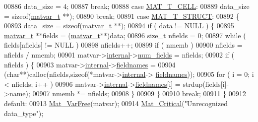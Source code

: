 \begin{DoxyCode}
{{{{{{{{{{{{{{{{{{{{{{00886             data\_size = 4;
00887             \textcolor{keywordflow}{break};
00888         \textcolor{keywordflow}{case} \hyperlink{group___m_a_t_ggacf7b3b879282b7ab3a51190e49bf3453a07599cf2cca6d2b2d059378563318ba5}{MAT\_T\_CELL}:
00889             data\_size = \textcolor{keyword}{sizeof}(\hyperlink{group___m_a_t_structmatvar__t}{matvar\_t} **);
00890             \textcolor{keywordflow}{break};
00891         \textcolor{keywordflow}{case} \hyperlink{group___m_a_t_ggacf7b3b879282b7ab3a51190e49bf3453a4f4d5a6e1d42c6aa81ffb810e5da5c85}{MAT\_T\_STRUCT}:
00892         \{
00893             data\_size = \textcolor{keyword}{sizeof}(\hyperlink{group___m_a_t_structmatvar__t}{matvar\_t} **);
00894             \textcolor{keywordflow}{if} ( data != NULL ) \{
00895                 \hyperlink{group___m_a_t_structmatvar__t}{matvar\_t} **fields = (\hyperlink{group___m_a_t_structmatvar__t}{matvar\_t}**)data;
00896                 \textcolor{keywordtype}{size\_t} nfields = 0;
00897                 \textcolor{keywordflow}{while} ( fields[nfields] != NULL )
00898                     nfields++;
00899                 \textcolor{keywordflow}{if} ( nmemb )
00900                     nfields = nfields / nmemb;
00901                 matvar->\hyperlink{group___m_a_t_a6e97e3ed9f40c49322c18561c2a94e92}{internal}->\hyperlink{structmatvar__internal_a93fc447484f455eddf9334f2e9e411c2}{num\_fields} = nfields;
00902                 \textcolor{keywordflow}{if} ( nfields ) \{
00903                     matvar->\hyperlink{group___m_a_t_a6e97e3ed9f40c49322c18561c2a94e92}{internal}->\hyperlink{structmatvar__internal_a7574d000bfc98ad4860ae6590b8d4985}{fieldnames} =
00904                         (\textcolor{keywordtype}{char}**)calloc(nfields,\textcolor{keyword}{sizeof}(*matvar->\hyperlink{group___m_a_t_a6e97e3ed9f40c49322c18561c2a94e92}{internal}->
      \hyperlink{structmatvar__internal_a7574d000bfc98ad4860ae6590b8d4985}{fieldnames}));
00905                     \textcolor{keywordflow}{for} ( i = 0; i < nfields; i++ )
00906                         matvar->\hyperlink{group___m_a_t_a6e97e3ed9f40c49322c18561c2a94e92}{internal}->\hyperlink{structmatvar__internal_a7574d000bfc98ad4860ae6590b8d4985}{fieldnames}[i] = strdup(fields[i]->name);
00907                     nmemb *= nfields;
00908                 \}
00909             \}
00910             \textcolor{keywordflow}{break};
00911         \}
00912         \textcolor{keywordflow}{default}:
00913             \hyperlink{group___m_a_t_ga1d14716f7450530fd1c9d02413787f0e}{Mat\_VarFree}(matvar);
00914             \hyperlink{group__mat__util_gaf51f2bfbb5580f575e4dd79757e2b80c}{Mat\_Critical}(\textcolor{stringliteral}{"Unrecognized data\_type"});
}}}}}}}}}}}}}}}}}}}}}}
\end{DoxyCode}
